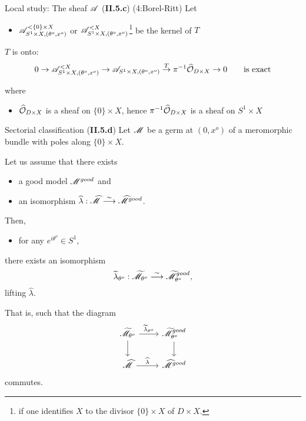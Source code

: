 \begin{frame}[t]{Local study: The sheaf $\mathscr{A}$ (\textbf{II.5.c}) (4:Borel-Ritt)}
  Let
  \begin{itemize}
    \item $\mathscr{A}_{S^1\times X,(\theta^o,x^o)}^{<\{0\}\times X}$ or
      $\mathscr{A}_{S^1\times X,(\theta^o,x^o)}^{<X}$\footnote{if one identifies $X$ to
      the divisor $\{0\}\times X$ of $D\times X$.} be the kernel of $T$
  \end{itemize}
  \begin{lem}
    $T$ is onto:
    \[
      0 \to              \mathscr{A}_{S^1\times X,(\theta^o,x^o)}^{<X}
        \to              \mathscr{A}_{S^1\times X,(\theta^o,x^o)}
        \overset{T}{\to} \pi^{-1}\widehat{\mathcal{O}}_{D\times X}
        \to 0
        \qquad
        \text{is exact}
    \]
  \end{lem}
  where
  \begin{itemize}
    \item $\widehat{\mathcal{O}}_{D\times X}$ is a sheaf on $\{0\}\times X$, hence
      $\pi^{-1}\widehat{\mathcal{O}}_{D\times X}$ is a sheaf on $S^1\times X$
  \end{itemize}
\end{frame}

\begin{frame}[fragile]{Sectorial classification (\textbf{II.5.d})}
  Let $\mathscr{M}$ be a germ at $(0,x^o)$ of a meromorphic bundle with poles along
  $\{0\}\times X$.
  \begin{thm}[II.5.12]
    Let us assume that there exists
    \begin{itemize}
      \item a good model $\mathscr{M}^{good}$ and
      \item an isomorphism $\widehat\lambda: \widehat{\mathscr{M}}
        \overset{\sim}{\longrightarrow}\widehat{\mathscr{M}}^{good}$.
    \end{itemize}
    Then,
    \begin{itemize}
      \item for any $e^{i\theta^o}\in S^1$,
    \end{itemize}
    there exists an isomorphism
    \[
      \widetilde\lambda_{\theta^o}: \widetilde{\mathscr{M}}_{\theta^o}
      \overset{\sim}{\longrightarrow}\widetilde{\mathscr{M}}^{good}_{\theta^o},
    \]
    lifting $\hat\lambda$.
  \end{thm}
  That is, such that the diagram
  \[ \begin{tikzcd}
      \tilde\sM_{\theta^o} \dar \rar{\tilde\lambda_{\theta^o}} &
        \tilde\sM^{good}_{\theta^o} \dar
        \\\hat\sM \rar{\hat\lambda} &
        \hat\sM^{good}
  \end{tikzcd} \]
  commutes.
\end{frame}

